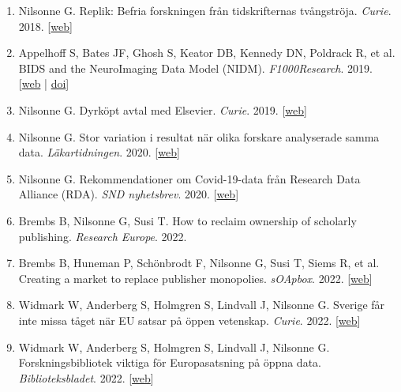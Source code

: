 \documentclass[10pt,a4paper,twocolumn]{article}
\begin{document}
\begin{enumerate}
    \item Nilsonne G. Replik: Befria forskningen från tidskrifternas tvångströja. \textit{Curie}. 2018. [\href{https://www.tidningencurie.se/debatt/replik-befria-forskningen-fran-tidskriftspubliceringens-tvangstroja/}{web}]

    \item Appelhoff S, Bates JF, Ghosh S, Keator DB, Kennedy DN, Poldrack R, et al. BIDS and the NeuroImaging Data Model (NIDM). \textit{F1000Research}. 2019. [\href{https://doi.org/10.7490/f1000research.1117293.1}{web} | \href{10.7490/f1000research.1117293.1}{doi}]

    \item Nilsonne G. Dyrköpt avtal med Elsevier. \textit{Curie}. 2019. [\href{https://www.tidningencurie.se/debatt/dyrkopt-avtal-med-elsevier/}{web}]

    \item Nilsonne G. Stor variation i resultat när olika forskare analyserade samma data. \textit{Läkartidningen}. 2020. [\href{https://lakartidningen.se/klinik-och-vetenskap-1/nya-ron/2020/06/stor-variation-i-resultat-nar-olika-forskare-analyserade-samma-data/}{web}]

    \item Nilsonne G. Rekommendationer om Covid-19-data från Research Data Alliance (RDA). \textit{SND nyhetsbrev}. 2020. [\href{https://www.anpdm.com/article/4340584A7644435E41724642514071/26886017/6186063}{web}]

    \item Brembs B, Nilsonne G, Susi T. How to reclaim ownership of scholarly publishing. \textit{Research Europe}. 2022.

    \item Brembs B, Huneman P, Schönbrodt F, Nilsonne G, Susi T, Siems R, et al. Creating a market to replace publisher monopolies. \textit{sOApbox}. 2022. [\href{https://www.coalition-s.org/blog/creating-a-market-to-replace-publisher-monopolies/}{web}]

    \item Widmark W, Anderberg S, Holmgren S, Lindvall J, Nilsonne G. Sverige får inte missa tåget när EU satsar på öppen vetenskap. \textit{Curie}. 2022. [\href{https://www.tidningencurie.se/debatt/sverige-far-inte-missa-taget-nar-eu-satsar-pa-oppen-vetenskap/}{web}]

    \item Widmark W, Anderberg S, Holmgren S, Lindvall J, Nilsonne G. Forskningsbibliotek viktiga för Europasatsning på öppna data. \textit{Biblioteksbladet}. 2022. [\href{https://www.biblioteksbladet.se/ideer/debatt/forskningsbibliotek-viktiga-for-europasatsning-pa-oppen-data/}{web}]


\end{enumerate}
\end{document}
